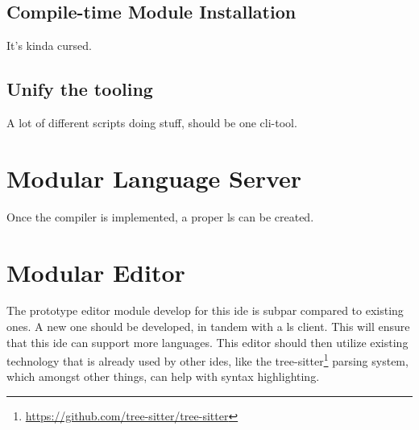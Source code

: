 \subsection{Compile-time Module Installation}

It's kinda cursed.

\subsection{Unify the tooling}

A lot of different scripts doing stuff, should be one \gls{cli}-tool.

\section{Modular Language Server}

Once the compiler \cite{wiig} is implemented, a proper \gls{ls} can be created.

\section{Modular Editor}

The prototype editor module develop for this \gls{ide} is subpar compared to
existing ones. A new one should be developed, in tandem with a \gls{ls} client.
This will ensure that this \gls{ide} can support more languages. This editor
should then utilize existing technology that is already used by other
\gls{ide}s, like the tree-sitter\footnote{\url{https://github.com/tree-sitter/tree-sitter}}
parsing system, which amongst other things, can help with syntax highlighting.
